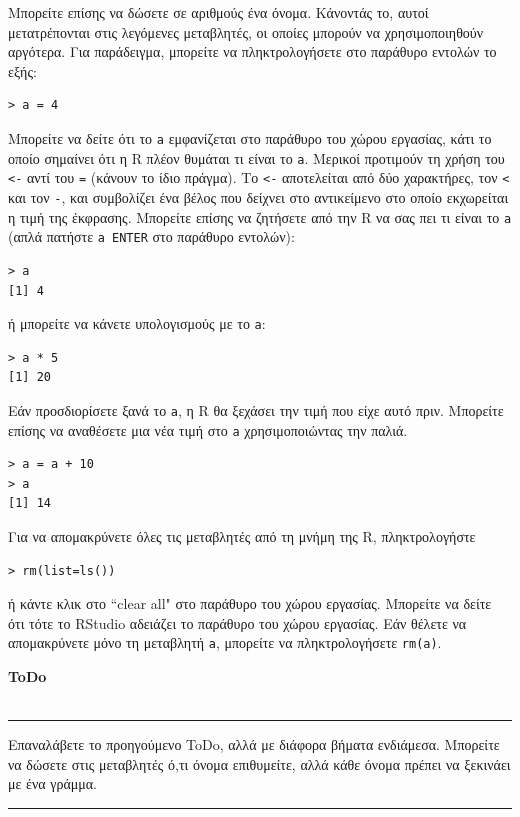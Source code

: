 \documentclass[a4paper,10pt,twocolumn]{article}
\makeatletter
\newenvironment{ToDo} {
  \begin{flushright}
    \hfill
    \begin{minipage}{0.9\columnwidth}
    \textsf{\textbf{ToDo}} \\
      \vspace{-0.7cm}\\
      {\color{Gray}\rule[-0.05cm]{\columnwidth}{1.5pt}}} {
      {\color{Gray}\rule[0.3cm]{\columnwidth}{1.5pt}}
    \end{minipage}
    \vspace{0.3cm}
  \end{flushright}
  }
\let\SF@@footnote\footnote
\def\footnote{\ifx\protect\@typeset@protect
 \expandafter\SF@@footnote
 \else
 \expandafter\SF@gobble@opt
 \fi
}
\edef\SF@gobble@opt{\noexpand\protect
 \expandafter\noexpand\csname SF@gobble@opt \endcsname}
\makeatother
\begin{document}
Μπορείτε επίσης να δώσετε σε αριθμούς ένα όνομα. Κάνοντάς το, αυτοί μετατρέπονται στις λεγόμενες
μεταβλητές, οι οποίες μπορούν να χρησιμοποιηθούν αργότερα. Για παράδειγμα, μπορείτε να πληκτρολογήσετε στο
παράθυρο εντολών το εξής: 
\begin{Verbatim}[frame=single,gobble=0]
> a = 4
\end{Verbatim}
Μπορείτε να δείτε ότι το \texttt{a} εμφανίζεται στο παράθυρο του χώρου εργασίας, κάτι το οποίο σημαίνει ότι η
R πλέον θυμάται τι είναι το \texttt{a}.\footnote{Μερικοί προτιμούν τη χρήση του \texttt{<-} αντί του
\texttt{=} (κάνουν το ίδιο πράγμα). Το \texttt{<-} αποτελείται από δύο χαρακτήρες, τον \texttt{<} και τον
\texttt{-}, και συμβολίζει ένα βέλος που δείχνει στο αντικείμενο στο οποίο εκχωρείται η τιμή της έκφρασης.} 
Μπορείτε επίσης να ζητήσετε από την R να σας πει τι είναι το \texttt{a} (απλά πατήστε \texttt{a ENTER} στο
παράθυρο εντολών):

\begin{Verbatim}[frame=single,gobble=0]
> a 
[1] 4
\end{Verbatim}

ή μπορείτε να κάνετε υπολογισμούς με το \texttt{a}: 

\begin{Verbatim}[frame=single,gobble=0]
> a * 5
[1] 20
\end{Verbatim}

Εάν προσδιορίσετε ξανά το \texttt{a}, η R θα ξεχάσει την τιμή που είχε αυτό πριν. Μπορείτε επίσης να αναθέσετε 
μια νέα τιμή στο \texttt{a} χρησιμοποιώντας την παλιά.

\begin{Verbatim}[frame=single,gobble=0]
> a = a + 10
> a
[1] 14
\end{Verbatim}

Για να απομακρύνετε όλες τις μεταβλητές από τη μνήμη της R, πληκτρολογήστε

\begin{Verbatim}[frame=single,gobble=0]
> rm(list=ls())
\end{Verbatim}

ή κάντε κλικ στο ``clear all" στο παράθυρο του χώρου εργασίας. Μπορείτε να δείτε ότι τότε το RStudio αδειάζει
το παράθυρο του χώρου εργασίας. Εάν θέλετε να απομακρύνετε μόνο τη μεταβλητή \texttt{a}, μπορείτε να
πληκτρολογήσετε \texttt{rm(a)}.

\begin{ToDo}
Επαναλάβετε το προηγούμενο ToDo, αλλά με διάφορα βήματα ενδιάμεσα. Μπορείτε να δώσετε στις μεταβλητές ό,τι όνομα
επιθυμείτε, αλλά κάθε όνομα πρέπει να ξεκινάει με ένα γράμμα. \\
\end{ToDo}
\end{document}
